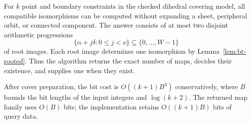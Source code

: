 \begin{theorem}\label{thm:bt-two-records}
For $k$ point and boundary constraints in the checked dihedral covering
model, all compatible isomorphisms can be computed without expanding a
sheet, peripheral orbit, or connected component.  The answer consists of
at most two disjoint arithmetic progressions
\[
 \{\alpha+j\delta:0\le j<\nu\}\subseteq\{0,\ldots,W-1\}
\]
of root images.  Each root image determines one isomorphism by
Lemma~\ref{lem:bt-rooted}.  Thus the algorithm returns the exact number of
maps, decides their existence, and supplies one when they exist.

After cover preparation, the bit cost is
$O((k+1)B^3)$ conservatively, where $B$ bounds the bit lengths of the
input integers and $\log(k+2)$.  The returned map family uses $O(B)$ bits;
the implementation retains $O((k+1)B)$ bits of query data.
\end{theorem}
